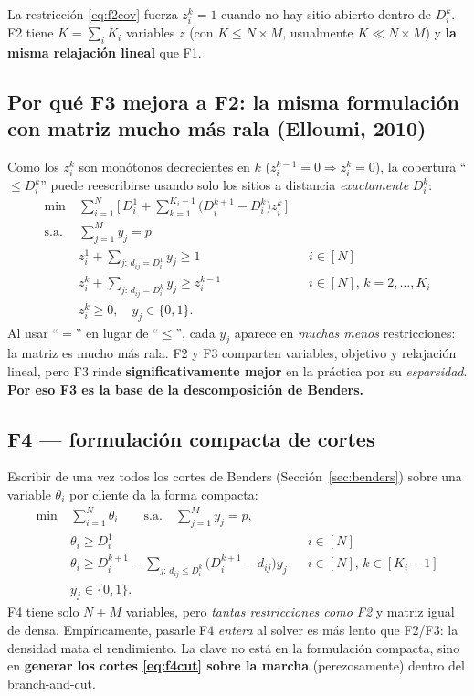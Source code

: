La restricción \eqref{eq:f2cov} fuerza $z^k_i=1$ cuando no hay sitio abierto dentro de $D^k_i$.
F2 tiene $K=\sum_i K_i$ variables $z$ (con $K\le N\times M$, usualmente $K\ll N\times M$) y
\textbf{la misma relajación lineal} que F1.

\subsection{Por qué F3 mejora a F2: la misma formulación con matriz mucho más rala (Elloumi, 2010)}
Como los $z^k_i$ son monótonos decrecientes en $k$ ($z^{k-1}_i=0\Rightarrow z^k_i=0$), la
cobertura ``$\le D^k_i$'' puede reescribirse usando solo los sitios a distancia \emph{exactamente}
$D^k_i$:
\begin{align}
  \min\ & \sum_{i=1}^{N}\Big[\,D^1_i + \sum_{k=1}^{K_i-1}\big(D^{k+1}_i-D^k_i\big)z^k_i\,\Big] \label{eq:f3obj}\\
  \text{s.a.}\ & \sum_{j=1}^{M} y_j=p \nonumber\\
  & z^1_i + \!\!\sum_{j:\,d_{ij}=D^1_i}\!\! y_j \ge 1 && i\in[N] \label{eq:f3base}\\
  & z^k_i + \!\!\sum_{j:\,d_{ij}=D^k_i}\!\! y_j \ge z^{k-1}_i && i\in[N],\,k=2,\dots,K_i \label{eq:f3rec}\\
  & z^k_i\ge 0,\quad y_j\in\{0,1\}. \nonumber
\end{align}
Al usar ``$=$'' en lugar de ``$\le$'', cada $y_j$ aparece en \emph{muchas menos} restricciones: la
matriz es mucho más rala. F2 y F3 comparten variables, objetivo y relajación lineal, pero F3
rinde \textbf{significativamente mejor} en la práctica por su \emph{esparsidad}. \textbf{Por eso
F3 es la base de la descomposición de Benders.}

\subsection{F4 — formulación compacta de cortes}
Escribir de una vez todos los cortes de Benders (Sección~\ref{sec:benders}) sobre una variable
$\theta_i$ por cliente da la forma compacta:
\begin{align}
  \min\ & \sum_{i=1}^N \theta_i \qquad\text{s.a.}\quad \sum_{j=1}^M y_j=p, \nonumber\\
  & \theta_i \ge D^1_i && i\in[N] \label{eq:f4base}\\
  & \theta_i \ge D^{k+1}_i-\!\!\sum_{j:\,d_{ij}\le D^k_i}\!\!\big(D^{k+1}_i-d_{ij}\big)y_j && i\in[N],\,k\in[K_i-1] \label{eq:f4cut}\\
  & y_j\in\{0,1\}. \nonumber
\end{align}
F4 tiene solo $N+M$ variables, pero \emph{tantas restricciones como F2} y matriz igual de densa.
Empíricamente, pasarle F4 \emph{entera} al solver es más lento que F2/F3: la densidad mata el
rendimiento. La clave no está en la formulación compacta, sino en \textbf{generar los cortes
\eqref{eq:f4cut} sobre la marcha} (perezosamente) dentro del branch-and-cut.

